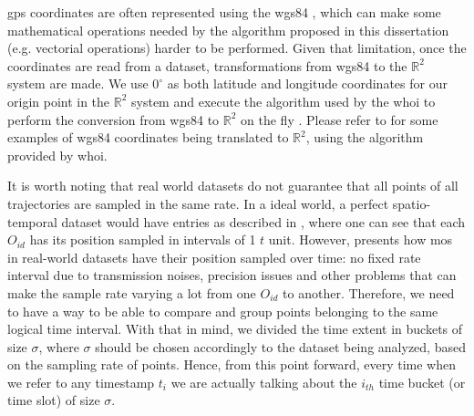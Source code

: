\ac{gps} coordinates are often represented using the \ac{wgs84} \citep{wgs84}, which can make some mathematical
operations needed by the algorithm proposed in this dissertation (e.g. vectorial operations) harder to be performed.
Given that limitation, once the coordinates are read from a dataset, transformations from \ac{wgs84} to the
$\mathbb{R}^2$ system are made. We use $0^\circ$ as both latitude and longitude coordinates for our origin point in the
$\mathbb{R}^2$ system and execute the algorithm used by the \ac{whoi} to perform the conversion from \ac{wgs84} to
$\mathbb{R}^2$ on the fly \citep{latlogtoxy}. Please refer to  for some examples of \ac{wgs84}
coordinates being translated to $\mathbb{R}^2$, using the algorithm provided by \ac{whoi}.

It is worth noting that real world datasets do not guarantee that all points of all trajectories are sampled in the same
rate. In a ideal world, a perfect spatio-temporal dataset would have entries as described in ,
where one can see that each $O_{id}$ has its position sampled in intervals of 1 $t$ unit. However,
presents how \acp{mo} in real-world datasets have their position sampled over time: no fixed rate
interval due to transmission noises, precision issues and other problems that can make the sample rate varying a lot
from one $O_{id}$ to another. Therefore, we need to have a way to be able to compare and group points belonging to the
same logical time interval. With that in mind, we divided the time extent in buckets of size $\sigma$, where $\sigma$
should be chosen accordingly to the dataset being analyzed, based on the sampling rate of points. Hence, from this point
forward, every time when we refer to any timestamp $t_i$ we are actually talking about the $i_{th}$ time bucket (or time
slot) of size $\sigma$.

